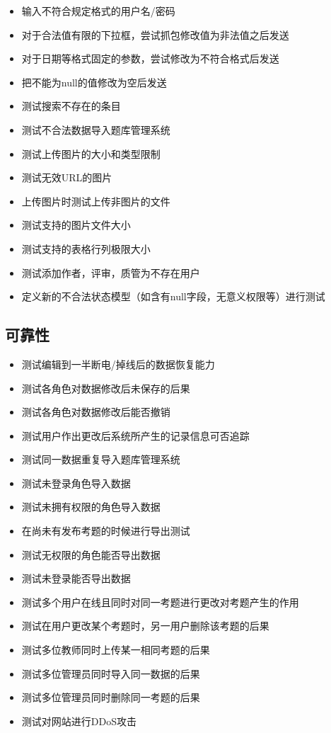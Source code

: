 \documentclass[hyperref, a4paper]{ctexart}
\providecommand{\tightlist}{%
  \setlength{\itemsep}{0pt}\setlength{\parskip}{0pt}}
\begin{document}
\begin{itemize}
\tightlist
\item
  输入不符合规定格式的用户名/密码
\item
  对于合法值有限的下拉框，尝试抓包修改值为非法值之后发送
\item
  对于日期等格式固定的参数，尝试修改为不符合格式后发送
\item
  把不能为null的值修改为空后发送
\item
  测试搜索不存在的条目
\item
  测试不合法数据导入题库管理系统
\item
  测试上传图片的大小和类型限制
\item
  测试无效URL的图片
\item
  上传图片时测试上传非图片的文件
\item
  测试支持的图片文件大小
\item
  测试支持的表格行列极限大小
\item
  测试添加作者，评审，质管为不存在用户
\item
  定义新的不合法状态模型（如含有null字段，无意义权限等）进行测试
\end{itemize}

\hypertarget{ux53efux9760ux6027}{%
\subsection{可靠性}\label{ux53efux9760ux6027}}

\begin{itemize}
\tightlist
\item
  测试编辑到一半断电/掉线后的数据恢复能力
\item
  测试各角色对数据修改后未保存的后果
\item
  测试各角色对数据修改后能否撤销
\item
  测试用户作出更改后系统所产生的记录信息可否追踪
\item
  测试同一数据重复导入题库管理系统
\item
  测试未登录角色导入数据
\item
  测试未拥有权限的角色导入数据
\item
  在尚未有发布考题的时候进行导出测试
\item
  测试无权限的角色能否导出数据
\item
  测试未登录能否导出数据
\item
  测试多个用户在线且同时对同一考题进行更改对考题产生的作用
\item
  测试在用户更改某个考题时，另一用户删除该考题的后果
\item
  测试多位教师同时上传某一相同考题的后果
\item
  测试多位管理员同时导入同一数据的后果
\item
  测试多位管理员同时删除同一考题的后果
\item
  测试对网站进行DDoS攻击
\end{itemize}
\end{document}
